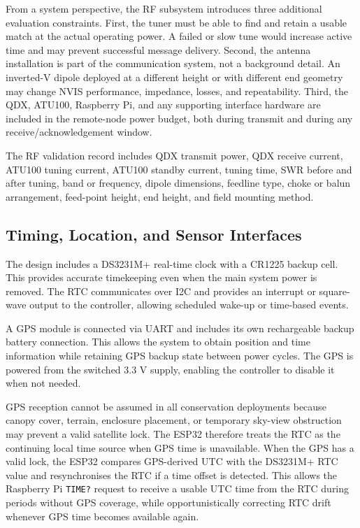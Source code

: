 \documentclass[acmsmall,screen]{acmart}
\begin{document}
From a system perspective, the RF subsystem introduces three additional evaluation constraints. First, the tuner must be able to find and retain a usable match at the actual operating power. A failed or slow tune would increase active time and may prevent successful message delivery. Second, the antenna installation is part of the communication system, not a background detail. An inverted-V dipole deployed at a different height or with different end geometry may change NVIS performance, impedance, losses, and repeatability. Third, the QDX, ATU100, Raspberry Pi, and any supporting interface hardware are included in the remote-node power budget, both during transmit and during any receive/acknowledgement window.

The RF validation record includes QDX transmit power, QDX receive current, ATU100 tuning current, ATU100 standby current, tuning time, SWR before and after tuning, band or frequency, dipole dimensions, feedline type, choke or balun arrangement, feed-point height, end height, and field mounting method.

\subsection{Timing, Location, and Sensor Interfaces}
The design includes a DS3231M+ real-time clock with a CR1225 backup cell. This provides accurate timekeeping even when the main system power is removed. The RTC communicates over I2C and provides an interrupt or square-wave output to the controller, allowing scheduled wake-up or time-based events.

A GPS module is connected via UART and includes its own rechargeable backup battery connection. This allows the system to obtain position and time information while retaining GPS backup state between power cycles. The GPS is powered from the switched 3.3 V supply, enabling the controller to disable it when not needed.

GPS reception cannot be assumed in all conservation deployments because canopy cover, terrain, enclosure placement, or temporary sky-view obstruction may prevent a valid satellite lock. The ESP32 therefore treats the RTC as the continuing local time source when GPS time is unavailable. When the GPS has a valid lock, the ESP32 compares GPS-derived UTC with the DS3231M+ RTC value and resynchronises the RTC if a time offset is detected. This allows the Raspberry Pi \texttt{TIME?} request to receive a usable UTC time from the RTC during periods without GPS coverage, while opportunistically correcting RTC drift whenever GPS time becomes available again.
\end{document}
